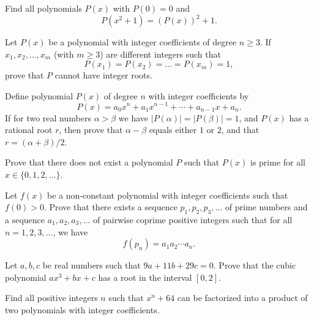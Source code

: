 \begin{question}
    Find all polynomials $P(x)$ with $P(0)=0$ and
    \[P(x^2+1) = (P(x))^2 + 1.\]
\end{question}


\begin{question}[name={1986 Czech And Slovak}]
    Let $P(x)$ be a polynomial with integer coefficients of degree $n \ge 3$. If $x_1,x_2,\dots,x_m$ (with $m \ge 3$) are different integers such that \[P(x_1) = P(x_2) = \dots = P(x_m) = 1,\] prove that $P$ cannot have integer roots.
\end{question}


\begin{question}
    Define polynomial $P(x)$ of degree $n$ with integer coefficients by
    \[P(x) = a_0x^n + a_1x^{n-1} + \cdots + a_{n-1}x + a_n.\]
    If for two real numbers $\alpha > \beta$ we have $|P(\alpha)|=|P(\beta)|=1$, and $P(x)$ has a rational root $r$, then prove that $\alpha-\beta$ equals either $1$ or $2$, and that $r=(\alpha+\beta)/2$.
\end{question}


\begin{question}
    Prove that there does not exist a polynomial $P$ such that $P(x)$ is prime for all $x\in \{0,1,2,\dots\}$.
\end{question}


\begin{question}
    Let $f(x)$ be a non-constant polynomial with integer coefficients such that $f(0)>0$. Prove that there exists a sequence $p_1,p_2,p_3,\dots$ of prime numbers and a sequence $a_1,a_2,a_3,\dots$ of pairwise coprime positive integers such that for all $n=1,2,3,\dots$, we have \[f(p_n) = a_1a_2\cdots a_n.\]
\end{question}



\begin{question}[name={1994 Iran First Round}]
    Let $a,b,c$ be real numbers such that $9a+11b+29c=0$. Prove that the cubic polynomial $ax^3+bx+c$ has a root in the interval $[0,2]$.
\end{question}


\begin{question}[name={1998 Bulgaria}]
    Find all positive integers $n$ such that $x^n+64$ can be factorized into a product of two polynomials with integer coefficients.
\end{question}



